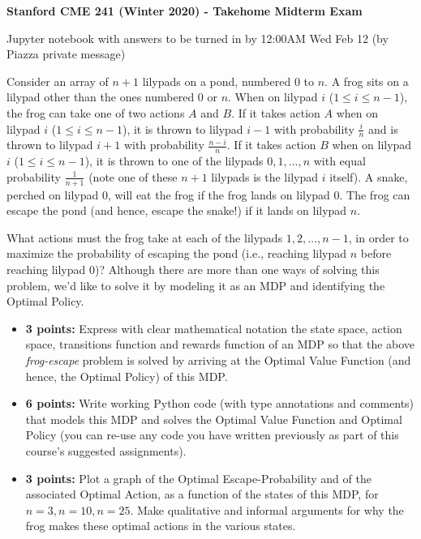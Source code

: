 \documentclass[12pt]{exam}
\begin{document}
\begin{center}
{\large {\bf Stanford CME 241 (Winter 2020) - Takehome Midterm Exam}}

Jupyter notebook with answers to be turned in by 12:00AM Wed Feb 12 (by Piazza private message)
\end{center}
\vspace{5mm}
 
\begin{questions}
 Consider an array of $n+1$ lilypads on a pond, numbered $0$ to $n$. A frog sits on a lilypad other than the ones numbered $0$ or $n$.  When on lilypad $i$ ($1\leq i \leq n-1$), the frog can take one of two actions $A$ and 
$B$. If it takes action $A$ when on lilypad $i$ ($1 \leq i \leq n-1$), it is thrown to lilypad $i-1$ with probability $\frac i n$ and is thrown to lilypad $i+1$ with probability $\frac {n-i} n$. If it takes action $B$ when on lilypad $i$ ($1\leq i \leq n-1$), it is thrown to one of the lilypads $0, 1, \ldots, n$ with equal probability $\frac 1 {n+1}$ (note one of these $n+1$ lilypads is the lilypad $i$ itself). A snake, perched on lilypad $0$, will eat the frog if the frog lands on lilypad $0$. The frog can escape the pond (and hence, escape the snake!) if it lands on lilypad $n$.

What actions must the frog take at each of the lilypads $1, 2, \ldots, n-1$, in order to maximize the probability of escaping the pond (i.e., reaching lilypad $n$ before reaching lilypad $0$)? Although there are more than one ways of solving this problem, we'd like to solve it by modeling it as an MDP and identifying the Optimal Policy.

\begin{itemize}
\item {\bf 3 points:} Express with clear mathematical notation the state space, action space, transitions function and rewards function of an MDP so that the above {\em frog-escape} problem is solved by arriving at the Optimal Value Function (and hence, the Optimal Policy) of this MDP.
\item {\bf 6 points:} Write working Python code (with type annotations and comments) that models this MDP and solves the Optimal Value Function and Optimal Policy (you can re-use any code you have written previously as part of this course's suggested assignments).
\item {\bf 3 points:} Plot a graph of the Optimal Escape-Probability and of the associated Optimal Action, as a function of the states of this MDP, for $n=3, n=10, n=25$. Make qualitative and informal arguments for why the frog makes these optimal actions in the various states.
\end{itemize}


\end{questions}
\end{document}
